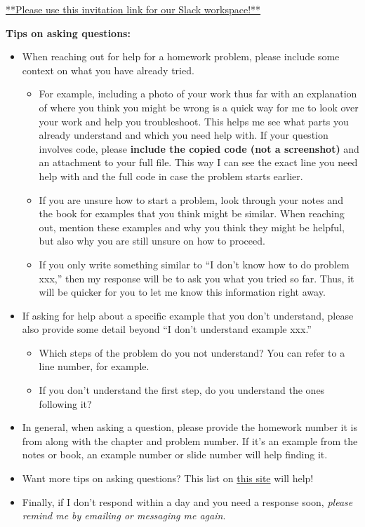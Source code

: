 \documentclass[
  letterpaper,
  DIV=11,
  numbers=noendperiod]{scrartcl}
\providecommand{\tightlist}{%
  \setlength{\itemsep}{0pt}\setlength{\parskip}{0pt}}\usepackage{longtable,booktabs,array}
\begin{document}
\href{https://join.slack.com/t/slack-xvk6383/shared_invite/zt-29g7biioz-XhPs~tj8xwL1GajEw9YlTg}{**Please
use this invitation link for our Slack workspace!**}

\textbf{Tips on asking questions:}

\begin{itemize}
\tightlist
\item
  When reaching out for help for a homework problem, please include some
  context on what you have already tried.

  \begin{itemize}
  \tightlist
  \item
    For example, including a photo of your work thus far with an
    explanation of where you think you might be wrong is a quick way for
    me to look over your work and help you troubleshoot. This helps me
    see what parts you already understand and which you need help with.
    If your question involves code, please \textbf{include the copied
    code (not a screenshot)} and an attachment to your full file. This
    way I can see the exact line you need help with and the full code in
    case the problem starts earlier.
  \item
    If you are unsure how to start a problem, look through your notes
    and the book for examples that you think might be similar. When
    reaching out, mention these examples and why you think they might be
    helpful, but also why you are still unsure on how to proceed.
  \item
    If you only write something similar to ``I don't know how to do
    problem xxx,'' then my response will be to ask you what you tried so
    far. Thus, it will be quicker for you to let me know this
    information right away.
  \end{itemize}
\item
  If asking for help about a specific example that you don't understand,
  please also provide some detail beyond ``I don't understand example
  xxx.''

  \begin{itemize}
  \tightlist
  \item
    Which steps of the problem do you not understand? You can refer to a
    line number, for example.
  \item
    If you don't understand the first step, do you understand the ones
    following it?
  \end{itemize}
\item
  In general, when asking a question, please provide the homework number
  it is from along with the chapter and problem number. If it's an
  example from the notes or book, an example number or slide number will
  help finding it.
\item
  Want more tips on asking questions? This list on
  \href{https://www.weareteachers.com/8-ways-to-pose-better-questions-in-math-class/}{this
  site} will help!
\item
  Finally, if I don't respond within a day and you need a response soon,
  \emph{please remind me by emailing or messaging me again}.
\end{itemize}
\end{document}
